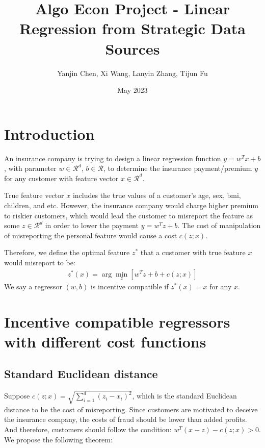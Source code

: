 \documentclass{article}
\title{Algo Econ Project - Linear Regression from Strategic Data Sources}
\author{Yanjin Chen, Xi Wang, Lanyin Zhang, Tijun Fu}
\date{May 2023}
\begin{document}
\maketitle

\section{Introduction}

An insurance company is trying to design a linear regression function $y = w^T x + b$, with parameter $ w \in \mathcal{R}^d$, $ b \in \mathcal{R}$, to determine the insurance payment/premium $y$ for any customer with feature vector $ x \in \mathcal{R}^d$. \vspace{2mm}

\noindent True feature vector $x$ includes the true values of a customer's age, sex, bmi, children, and etc. However, the insurance company would charge higher premium to riskier customers, which would lead the customer to misreport the feature as some $ z \in \mathcal{R}^d$ in order to lower the payment $y = w^T z + b$. The cost of manipulation of misreporting the personal feature would cause a cost $c(z;x)$. \vspace{2mm}

\noindent Therefore, we define the optimal feature $z^*$ that a customer with true feature $x$ would misreport to be: 
\begin{align*}
z^* (x)= \arg\min\limits_z [w^T z + b + c(z;x) ]
\end{align*}
We say a regressor $(w,b)$ is incentive compatible if $z^*(x) = x$ for any $x$.

\section{Incentive compatible regressors with different cost functions}
\subsection{Standard Euclidean distance}
Suppose $c(z;x)=\sqrt{\sum_{i=1}^d (z_i-x_i)^2}$, which is the standard Euclidean distance to be the cost of misreporting. Since customers are motivated to deceive the insurance company, the costs of fraud should be lower than added profits. And therefore, customers should follow the condition: 
$w^T (x-z) - {c(z;x)}>0$. 
We propose the following theorem:
\end{document}
